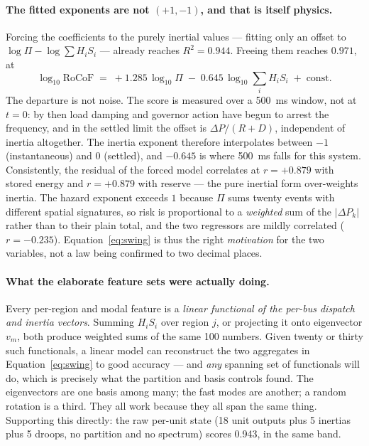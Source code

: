 \documentclass[11pt,a4paper]{article}
\newcommand{\rocof}{\ensuremath{\mathrm{RoCoF}}}
\newcommand{\Rtwo}{\ensuremath{R^{2}}}
\begin{document}
\paragraph{The fitted exponents are not $(+1,-1)$, and that is itself
physics.} Forcing the coefficients to the purely inertial values --- fitting
only an offset to $\log\Pi - \log\sum H_iS_i$ --- already reaches
$\Rtwo=0.944$. Freeing them reaches $0.971$, at
\begin{equation}
\log_{10}\rocof \;=\; +1.285\,\log_{10}\Pi \;-\; 0.645\,\log_{10}\textstyle\sum_i H_iS_i
\;+\; \text{const}.
\end{equation}
The departure is not noise. The score is measured over a
\SI{500}{\milli\second} window, not at $t=0$: by then load damping and
governor action have begun to arrest the frequency, and in the settled limit
the offset is $\Delta P/(R+D)$, independent of inertia altogether. The
inertia exponent therefore interpolates between $-1$ (instantaneous) and $0$
(settled), and $-0.645$ is where \SI{500}{\milli\second} falls for this
system. Consistently, the residual of the forced model correlates at
$r=+0.879$ with stored energy and $r=+0.879$ with reserve --- the pure
inertial form over-weights inertia. The hazard exponent exceeds $1$ because
$\Pi$ sums twenty events with different spatial signatures, so risk is
proportional to a \emph{weighted} sum of the $|\Delta P_k|$ rather than to
their plain total, and the two regressors are mildly correlated
($r=-0.235$). Equation~\ref{eq:swing} is thus the right \emph{motivation}
for the two variables, not a law being confirmed to two decimal places.

\paragraph{What the elaborate feature sets were actually doing.} Every
per-region and modal feature is a \emph{linear functional of the per-bus
dispatch and inertia vectors}. Summing $H_iS_i$ over region $j$, or
projecting it onto eigenvector $v_m$, both produce weighted sums of the same
100 numbers. Given twenty or thirty such functionals, a linear model can
reconstruct the two aggregates in Equation~\ref{eq:swing} to good accuracy
--- and \emph{any} spanning set of functionals will do, which is precisely
what the partition and basis controls found. The eigenvectors are one basis
among many; the fast modes are another; a random rotation is a third. They
all work because they all span the same thing. Supporting this directly: the
raw per-unit state (18 unit outputs plus 5 inertias plus 5 droops, no
partition and no spectrum) scores 0.943, in the same band.
\end{document}
